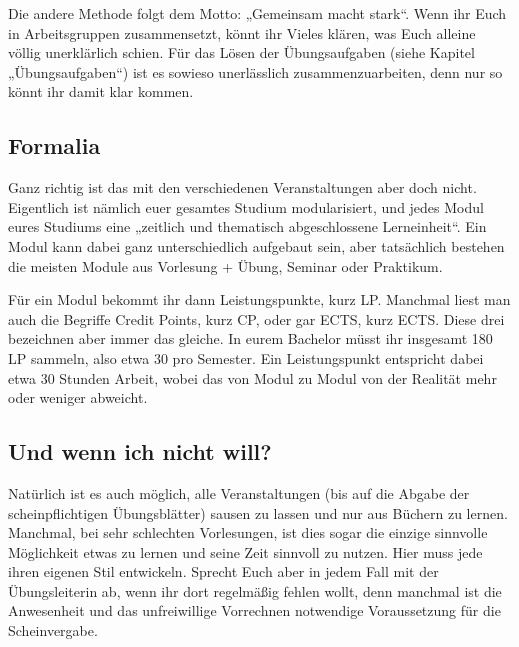 Die andere Methode folgt dem Motto: „Gemeinsam macht stark“. Wenn ihr Euch in Arbeitsgruppen zusammensetzt, könnt ihr Vieles klären, was Euch alleine völlig unerklärlich schien. Für das Lösen der Übungsaufgaben (siehe Kapitel „Übungsaufgaben“) ist es sowieso unerlässlich zusammenzuarbeiten, denn nur so könnt ihr damit klar kommen.

\subsection{Formalia}

Ganz richtig ist das mit den verschiedenen Veranstaltungen aber doch nicht. Eigentlich ist nämlich euer gesamtes Studium modularisiert, und jedes Modul eures Studiums eine „zeitlich und thematisch abgeschlossene Lerneinheit“. Ein Modul kann dabei ganz unterschiedlich aufgebaut sein, aber tatsächlich bestehen die meisten Module aus Vorlesung + Übung, Seminar oder Praktikum.

Für ein Modul bekommt ihr dann Leistungspunkte, kurz \gls{LP}. Manchmal liest man auch die Begriffe Credit Points, kurz \gls{CP}, oder gar \gls{ECTS}, kurz ECTS. Diese drei bezeichnen aber immer das gleiche. In eurem Bachelor müsst ihr insgesamt 180 \gls{LP} sammeln, also etwa 30 pro Semester. Ein Leistungspunkt entspricht dabei etwa 30 Stunden Arbeit, wobei das von Modul zu Modul von der Realität mehr oder weniger abweicht.

\subsection{Und wenn ich nicht will?}

Natürlich ist es auch möglich, alle Veranstaltungen (bis auf die Abgabe der scheinpflichtigen Übungsblätter) sausen zu lassen und nur aus Büchern zu lernen. Manchmal, bei sehr schlechten Vorlesungen, ist dies sogar die einzige sinnvolle Möglichkeit etwas zu lernen und seine Zeit sinnvoll zu nutzen. Hier muss jede ihren eigenen Stil entwickeln. Sprecht Euch aber in jedem Fall mit der Übungsleiterin ab, wenn ihr dort regelmäßig fehlen wollt, denn manchmal ist die Anwesenheit und das unfreiwillige Vorrechnen notwendige Voraussetzung für die Scheinvergabe.
